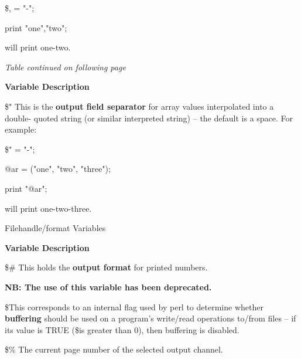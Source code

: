 \documentclass[a4paper,11pt]{book}
\begin{document}
\noindent \eject 

\noindent \$, = "-";

\noindent print "one","two";

\noindent 

\noindent will print one-two.

\noindent 

\noindent 

\noindent 

\noindent 

\noindent 

\noindent 

\noindent \textit{Table continued on following page}

\noindent \eject 

\noindent 

\noindent \textbf{Variable Description}

\noindent 

\noindent \$" This is the \textbf{output field separator }for array values interpolated into a double- quoted string (or similar interpreted string) -- the default is a space. For example:

\noindent 

\noindent \$" = "-";

\noindent @ar = ("one", "two", "three");

\noindent print "@ar";

\noindent 

\noindent will print one-two-three.

\noindent 

\noindent 

\noindent 

\noindent Filehandle/format Variables

\noindent 

\noindent \textbf{Variable Description}

\noindent 

\noindent \$\# This holds the \textbf{output format }for printed numbers.

\noindent \textbf{NB: The use of this variable has been deprecated.}

\noindent \$\textbar  This corresponds to an internal flag used by perl to determine whether \textbf{buffering }should be used on a program's write/read operations to/from files -- if its value is TRUE (\$\textbar  is greater than 0), then buffering is disabled.

\noindent \$\% The current page number of the selected output channel.
\end{document}
